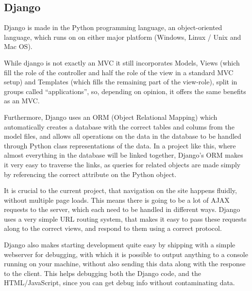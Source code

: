 \subsection{Django}
Django is made in the Python programming language, an object-oriented language, 
which runs on on either major platform 
(Windows, Linux / Unix and Mac OS)\cite{psf11}.
 
While django is not exactly an MVC\cite{dalling09} it still incorporates 
Models, Views (which fill the role of the controller and half the role of the 
view in a standard MVC setup) and Templates (which fills the remaining part of 
the view-role), split in groups called ``applications'', so, depending on 
opinion, it offers the same benefits as an MVC.

Furthermore, Django uses an ORM (Object Relational Mapping)\cite{techtarget08} 
which automatically creates a database with the correct tables and colums from 
the model files, and allows all operations on the data in the database to be 
handled through Python class representations of the data. 
In a project like this, where almost everything in the 
database will be linked together, 
Django's ORM makes it very easy to traverse the links, as queries for related 
objects are made simply by referencing the correct attribute on the 
Python object.

It is crucial to the current project, that navigation on the site happens 
fluidly, without multiple page loads. This means there is going to be a lot of 
AJAX requests to the server, 
which each need to be handled in different ways. 
Django uses a very simple URL routing system, that makes it easy to pass these 
requests along to the correct views, and respond to them using a 
correct protocol.

Django also makes starting development quite easy by shipping with a simple 
webserver for debugging, with which it is possible to output anything to a 
console running on your machine, without also sending this data along with the 
response to the client. This helps debugging both the Django code, and the 
HTML/JavaScript, since you can get debug info without contaminating data.

